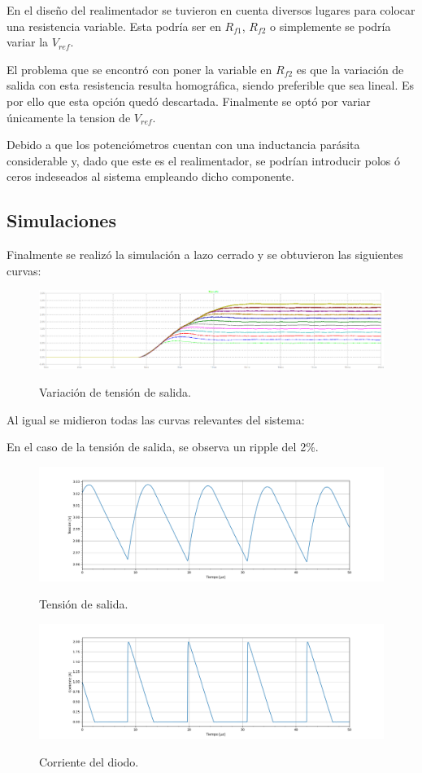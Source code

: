 En el diseño del realimentador se tuvieron en cuenta diversos lugares para colocar una resistencia variable. Esta podría ser en $R_{f1}$, $R_{f2}$ o simplemente se podría variar la $V_{ref}$.

El problema que se encontró con poner la variable en $R_{f2}$ es que la variación de salida con esta resistencia resulta homográfica, siendo preferible que sea lineal. Es por ello que esta opción quedó descartada. Finalmente se optó por variar únicamente la tension de $V_{ref}$.

Debido a que los potenciómetros cuentan con una inductancia parásita considerable y, dado que este es el realimentador, se podrían introducir polos ó ceros indeseados al sistema empleando dicho componente.
 \subsection{Simulaciones}
Finalmente se realizó la simulación a lazo cerrado y se obtuvieron las siguientes curvas:

\begin{figure}[H]
	\centering
	\includegraphics[width=0.9\linewidth]{ImagenesParteIII/Vouts.png}
	\label{fig:vouts_3}
	\caption{Variación de tensión de salida.}
\end{figure}
Al igual se midieron todas las curvas relevantes del sistema:

En el caso de la tensión de salida, se observa un ripple del 2\%.
\begin{figure}[H]
	\centering
	\includegraphics[width=\linewidth]{ImagenesParteIII/Vo.png}
	\label{fig:voIII}
	\caption{Tensión de salida.}
\end{figure}

\begin{figure}[H]
	\centering
	\includegraphics[width=\linewidth]{ImagenesParteIII/Idiodo.png}
	\label{fig:idiodoIII}
	\caption{Corriente del diodo.}
\end{figure}

